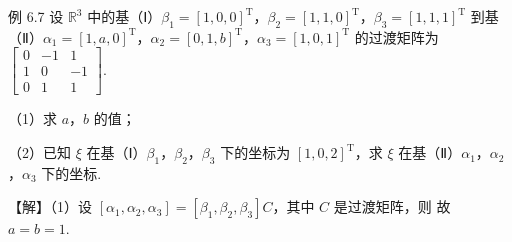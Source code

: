 \begin{fcard}{例 6.7}
设 $\mathbb{R}^3$ 中的基（Ⅰ）$\beta_1=[1,0,0]^{\mathrm T}$，$\beta_2=[1,1,0]^{\mathrm T}$，$\beta_3=[1,1,1]^{\mathrm T}$ 到基（Ⅱ）$\alpha_1=[1,a,0]^{\mathrm T}$，$\alpha_2=[0,1,b]^{\mathrm T}$，$\alpha_3=[1,0,1]^{\mathrm T}$ 的过渡矩阵为 $\begin{bmatrix}0&-1&1\\1&0&-1\\0&1&1\end{bmatrix}$.

（1）求 $a$，$b$ 的值；

（2）已知 $\xi$ 在基（Ⅰ）$\beta_1$，$\beta_2$，$\beta_3$ 下的坐标为 $[1,0,2]^{\mathrm T}$，求 $\xi$ 在基（Ⅱ）$\alpha_1$，$\alpha_2$，$\alpha_3$ 下的坐标.

【解】（1）设 $[\alpha_1,\alpha_2,\alpha_3]=[\beta_1,\beta_2,\beta_3]C$，其中 $C$ 是过渡矩阵，则
故 $a=b=1$.


\end{fcard}
